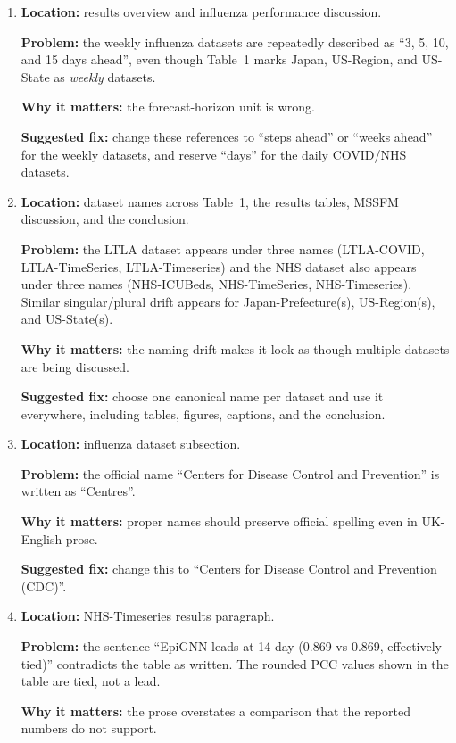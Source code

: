 \documentclass[11pt]{article}
\begin{document}
\begin{enumerate}

\item \textbf{Location:} results overview and influenza performance discussion.

\textbf{Problem:} the weekly influenza datasets are repeatedly described as ``3, 5, 10, and 15 days ahead'', even though Table~1 marks Japan, US-Region, and US-State as \emph{weekly} datasets.

\textbf{Why it matters:} the forecast-horizon unit is wrong.

\textbf{Suggested fix:} change these references to ``steps ahead'' or ``weeks ahead'' for the weekly datasets, and reserve ``days'' for the daily COVID/NHS datasets.

\item \textbf{Location:} dataset names across Table~1, the results tables, MSSFM discussion, and the conclusion.

\textbf{Problem:} the LTLA dataset appears under three names (LTLA-COVID, LTLA-TimeSeries, LTLA-Timeseries) and the NHS dataset also appears under three names (NHS-ICUBeds, NHS-TimeSeries, NHS-Timeseries). Similar singular/plural drift appears for Japan-Prefecture(s), US-Region(s), and US-State(s).

\textbf{Why it matters:} the naming drift makes it look as though multiple datasets are being discussed.

\textbf{Suggested fix:} choose one canonical name per dataset and use it everywhere, including tables, figures, captions, and the conclusion.

\item \textbf{Location:} influenza dataset subsection.

\textbf{Problem:} the official name ``Centers for Disease Control and Prevention'' is written as ``Centres''.

\textbf{Why it matters:} proper names should preserve official spelling even in UK-English prose.

\textbf{Suggested fix:} change this to ``Centers for Disease Control and Prevention (CDC)''.

\item \textbf{Location:} NHS-Timeseries results paragraph.

\textbf{Problem:} the sentence ``EpiGNN leads at 14-day (0.869 vs 0.869, effectively tied)'' contradicts the table as written. The rounded PCC values shown in the table are tied, not a lead.

\textbf{Why it matters:} the prose overstates a comparison that the reported numbers do not support.


\end{enumerate}
\end{document}
